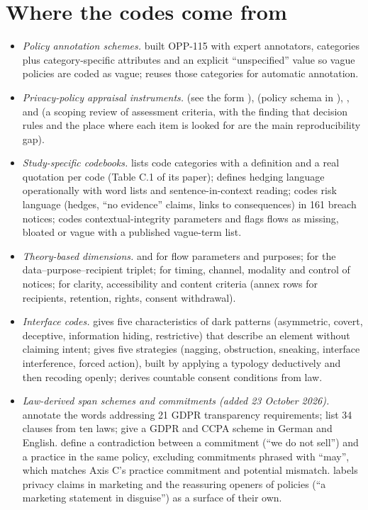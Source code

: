 \section{Where the codes come from}
\begin{itemize}
\item \emph{Policy annotation schemes.}  built OPP-115 with expert annotators, categories plus category-specific attributes and an explicit ``unspecified'' value so vague policies are coded as vague;  reuses those categories for automatic annotation.
\item \emph{Privacy-policy appraisal instruments.}  (see the form ),  (policy schema in ), ,  and  (a scoping review of assessment criteria, with the finding that decision rules and the place where each item is looked for are the main reproducibility gap).
\item \emph{Study-specific codebooks.}  lists code categories with a definition and a real quotation per code (Table C.1 of its paper);  defines hedging language operationally with word lists and sentence-in-context reading;  codes risk language (hedges, ``no evidence'' claims, links to consequences) in 161 breach notices;  codes contextual-integrity parameters and flags flows as missing, bloated or vague with a published vague-term list.
\item \emph{Theory-based dimensions.}  and  for flow parameters and purposes;  for the data--purpose--recipient triplet;  for timing, channel, modality and control of notices;  for clarity, accessibility and content criteria (annex rows for recipients, retention, rights, consent withdrawal).
\item \emph{Interface codes.}  gives five characteristics of dark patterns (asymmetric, covert, deceptive, information hiding, restrictive) that describe an element without claiming intent;  gives five strategies (nagging, obstruction, sneaking, interface interference, forced action), built by applying a typology deductively and then recoding openly;  derives countable consent conditions from law.
\item \emph{Law-derived span schemes and commitments (added 23 October 2026).}  annotate the words addressing 21 GDPR transparency requirements;  list 34 clauses from ten laws;  give a GDPR and CCPA scheme in German and English.  define a contradiction between a commitment (``we do not sell'') and a practice in the same policy, excluding commitments phrased with ``may'', which matches Axis C's practice commitment and potential mismatch.  labels privacy claims in marketing and the reassuring openers of policies (``a marketing statement in disguise'') as a surface of their own.
\end{itemize}

